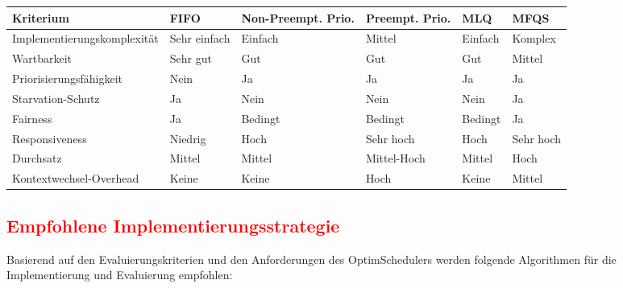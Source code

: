 \begin{table}[H]
    \centering
    {\small
    \begin{tabular}{|p{}|p{}|p{}|p{}|p{}|p{}|}
        \hline
        \textbf{Kriterium} & \textbf{FIFO} & \textbf{Non-Preempt. Prio.} & \textbf{Preempt. Prio.} & \textbf{MLQ} & \textbf{MFQS} \\
        \hline
        Implementierungskomplexität & Sehr einfach & Einfach & Mittel & Einfach & Komplex \\
        \hline
        Wartbarkeit & Sehr gut & Gut & Gut & Gut & Mittel \\
        \hline
        Priorisierungsfähigkeit & Nein & Ja & Ja & Ja & Ja \\
        \hline
        Starvation-Schutz & Ja & Nein & Nein & Nein & Ja \\
        \hline
        Fairness & Ja & Bedingt & Bedingt & Bedingt & Ja \\
        \hline
        Responsiveness & Niedrig & Hoch & Sehr hoch & Hoch & Sehr hoch \\
        \hline
        Durchsatz & Mittel & Mittel & Mittel-Hoch & Mittel & Hoch \\
        \hline
        Kontextwechsel-Overhead & Keine & Keine & Hoch & Keine & Mittel \\
        \hline
    \end{tabular}
    }
\end{table}

\subsection{\textcolor{red}{Empfohlene Implementierungsstrategie}}

Basierend auf den Evaluierungskriterien und den Anforderungen des OptimSchedulers werden folgende Algorithmen für die Implementierung und Evaluierung empfohlen:

